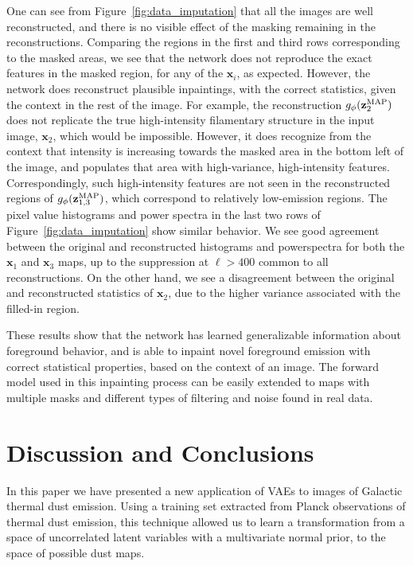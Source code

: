 \documentclass[fleqn,usenatbib]{mnras}
\begin{document}
One can see from Figure~\ref{fig:data_imputation} that all the images are well reconstructed, and there is no visible effect of the masking remaining in the reconstructions. Comparing the regions in the first and third rows corresponding to the masked areas, we see that the network does not reproduce the exact features in the masked region, for any of the $\mathbf x_i$, as expected. However, the network does reconstruct plausible inpaintings, with the correct statistics, given the context in the rest of the image. For example, the reconstruction $g_\phi(\mathbf z_2^{\rm MAP})$ does not replicate the true high-intensity filamentary structure in the input image, $\mathbf x_2$, which would be impossible. However, it does recognize from the context that intensity is increasing towards the masked area in the bottom left of the image, and populates that area with high-variance, high-intensity features. Correspondingly, such high-intensity features are not seen in the reconstructed regions of $g_\phi(\mathbf z_{1, 3}^{\rm MAP})$, which correspond to relatively low-emission regions. The pixel value histograms and power spectra in the last two rows of Figure~\ref{fig:data_imputation} show similar behavior. We see good agreement between the original and reconstructed histograms and powerspectra for both the $\mathbf x_1$ and $\mathbf x_3$ maps, up to the suppression at $\ell > 400$ common to all reconstructions. On the other hand, we see a disagreement between the original and reconstructed statistics of $\mathbf x_2$, due to the higher variance associated with the filled-in region.

These results show that the network has learned generalizable information about foreground behavior, and is able to inpaint novel foreground emission with correct statistical properties, based on the context of an image. The forward model used in this inpainting process can be easily extended to maps with multiple masks and different types of filtering and noise found in real data.

\section{Discussion and Conclusions}
\label{sec:conclusions} 

In this paper we have presented a new application of VAEs to images of Galactic thermal dust emission. Using a training set extracted from Planck observations of thermal dust emission, this technique allowed us to learn a transformation from a space of uncorrelated latent variables with a multivariate normal prior, to the space of possible dust maps.
 
\end{document}
